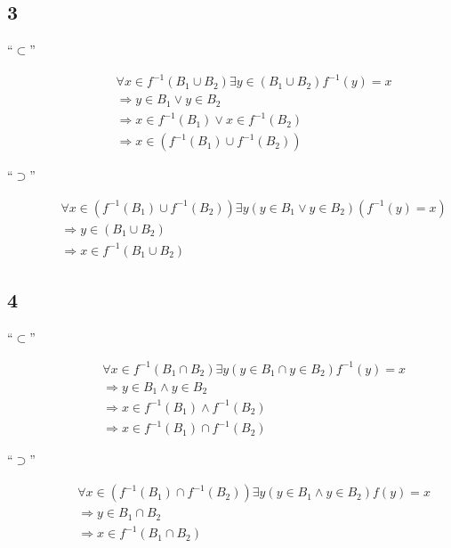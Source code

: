 \documentclass[a4paper,10pt]{article}
\begin{document}
\subsection*{3}

\begin{description}
 \item[``$\subset$'']
 \begin{align*}
  & \forall x \in f^{-1}(B_1 \cup B_2) \exists y \in (B_1 \cup B_2) f^{-1}(y) = x\\
  & \Rightarrow y \in B_1 \lor y \in B_2\\
  & \Rightarrow x \in f^{-1}(B_1) \lor x \in f^{-1}(B_2)\\
  & \Rightarrow x \in (f^{-1}(B_1) \cup f^{-1}(B_2))
 \end{align*}
 
 \item[``$\supset$'']
 \begin{align*}
  & \forall x \in (f^{-1}(B_1) \cup f^{-1}(B_2)) \exists y (y \in B_1 \lor y \in B_2) (f^{-1}(y) = x)\\
  & \Rightarrow y \in (B_1 \cup B_2)\\
  & \Rightarrow x \in f^{-1}(B_1 \cup B_2)
 \end{align*}
\end{description}

\subsection*{4}

\begin{description}
 \item[``$\subset$'']
 \begin{align*}
  & \forall x \in f^{-1}(B_1 \cap B_2) \exists y (y \in B_1 \cap y \in B_2) f^{-1}(y) = x\\
  & \Rightarrow y \in B_1 \land y \in B_2\\
  & \Rightarrow x \in f^{-1}(B_1) \land f^{-1}(B_2)\\
  & \Rightarrow x \in f^{-1}(B_1) \cap f^{-1}(B_2)
 \end{align*}
 
 \item[``$\supset$'']
 \begin{align*}
  & \forall x \in (f^{-1}(B_1) \cap f^{-1}(B_2)) \exists y (y \in B_1 \land y \in B_2) f(y) = x\\
  & \Rightarrow y \in B_1 \cap B_2\\
  & \Rightarrow x \in f^{-1}(B_1 \cap B_2)
 \end{align*}
\end{description}
\end{document}
